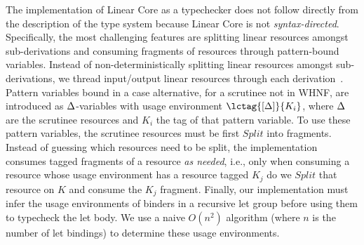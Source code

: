 \documentclass[acmsmall,review,anonymous,screen]{acmart}
\begin{document}
The implementation of Linear Core as a typechecker does not follow
directly from the description of the type system because Linear Core
is not \emph{syntax-directed}. Specifically, the most challenging
features are splitting linear resources amongst sub-derivations and
consuming fragments of resources through pattern-bound variables.
Instead of non-deterministically splitting linear resources amongst
sub-derivations, we thread input/output linear resources through each
derivation~\cite{DBLP:journals/tcs/CervesatoHP00}.
%
Pattern variables bound in a case alternative, for a scrutinee not in WHNF, are
introduced as $\Delta$-variables with usage environment $\lctag{\irr{\D}}{K_i}$,
where $\Delta$ are the scrutinee resources and $K_i$ the tag of that pattern
variable. To use these pattern variables, the scrutinee resources must be first
$Split$ into fragments. Instead of guessing which resources need to be split,
the implementation consumes tagged fragments of a resource \emph{as needed},
i.e., only when consuming a resource whose usage environment has a resource
tagged $K_j$ do we $Split$ that resource on $K$ and consume the $K_j$ fragment.
%
Finally, our implementation must infer the usage environments of binders in
a recursive let group before using them to typecheck the let body. We use a
naive $O(n^2)$ algorithm (where $n$ is the number of let bindings) to determine
these usage environments. %
%
%
%
%



\end{document}
